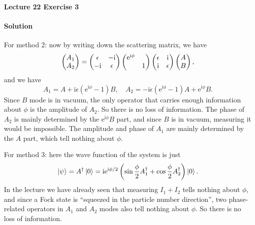\documentclass[hyperref, a4paper]{article}
\newcommand*{\ii}{\mathrm{i}}
\newcommand*{\ee}{\mathrm{e}}
\begin{document}
\paragraph{Lecture 22 Exercise 3}

\paragraph{Solution} For method 2: 
now by writing down the scattering matrix, we have
\begin{equation}
    \pmqty{A_1 \\ A_2} = \pmqty{\epsilon & - \ii  \\ - \ii  & \epsilon} 
    \pmqty{ \dmat{\ee^{\ii \phi}, 1} } 
    \pmqty{ \epsilon & \ii  \\ \ii  & \epsilon } \pmqty{A \\ B},
\end{equation}
and we have 
\begin{equation}
    A_1 = A + \ii \epsilon (\ee^{\ii \phi} - 1) B, \quad 
    A_2 = - \ii \epsilon (\ee^{\ii \phi} - 1) A + \ee^{\ii \phi} B.
\end{equation}
Since $B$ mode is in vacuum, 
the only operator that carries enough information about $\phi$
is the amplitude of $A_2$.
So there is no loss of information.
The phase of $A_2$ is mainly determined by the $\ee^{\ii \phi} B$ part,
and since $B$ is in vacuum,
measuring it would be impossible.
The amplitude and phase of $A_1$ are mainly determined by the $A$ part, 
which tell nothing about $\phi$.

For method 3: here the wave function of the system is just 
\begin{equation}
    \ket{\psi} = A^\dagger \ket{0} = \ii \ee^{\ii \phi / 2} 
    \left( \sin \frac{\phi}{2} A_1^\dagger + \cos \frac{\phi}{2} A_2^\dagger \right)  \ket{0}.
\end{equation}
In the lecture we have already seen that measuring $I_1 + I_2$ tells nothing about $\phi$,
and since a Fock state is ``squeezed in the particle number direction'',
two phase-related operators in $A_1$ and $A_2$ modes also tell nothing about $\phi$.
So there is no loss of information.
\end{document}
